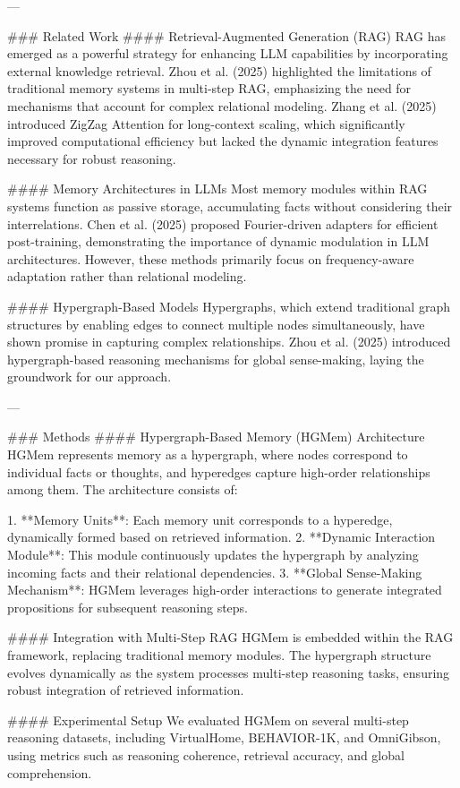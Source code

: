 ---

### Related Work  
#### Retrieval-Augmented Generation (RAG)  
RAG has emerged as a powerful strategy for enhancing LLM capabilities by incorporating external knowledge retrieval. Zhou et al. (2025) highlighted the limitations of traditional memory systems in multi-step RAG, emphasizing the need for mechanisms that account for complex relational modeling. Zhang et al. (2025) introduced ZigZag Attention for long-context scaling, which significantly improved computational efficiency but lacked the dynamic integration features necessary for robust reasoning.

#### Memory Architectures in LLMs  
Most memory modules within RAG systems function as passive storage, accumulating facts without considering their interrelations. Chen et al. (2025) proposed Fourier-driven adapters for efficient post-training, demonstrating the importance of dynamic modulation in LLM architectures. However, these methods primarily focus on frequency-aware adaptation rather than relational modeling.

#### Hypergraph-Based Models  
Hypergraphs, which extend traditional graph structures by enabling edges to connect multiple nodes simultaneously, have shown promise in capturing complex relationships. Zhou et al. (2025) introduced hypergraph-based reasoning mechanisms for global sense-making, laying the groundwork for our approach.

---

### Methods  
#### Hypergraph-Based Memory (HGMem) Architecture  
HGMem represents memory as a hypergraph, where nodes correspond to individual facts or thoughts, and hyperedges capture high-order relationships among them. The architecture consists of:

1. **Memory Units**: Each memory unit corresponds to a hyperedge, dynamically formed based on retrieved information.
2. **Dynamic Interaction Module**: This module continuously updates the hypergraph by analyzing incoming facts and their relational dependencies.
3. **Global Sense-Making Mechanism**: HGMem leverages high-order interactions to generate integrated propositions for subsequent reasoning steps.

#### Integration with Multi-Step RAG  
HGMem is embedded within the RAG framework, replacing traditional memory modules. The hypergraph structure evolves dynamically as the system processes multi-step reasoning tasks, ensuring robust integration of retrieved information.

#### Experimental Setup  
We evaluated HGMem on several multi-step reasoning datasets, including VirtualHome, BEHAVIOR-1K, and OmniGibson, using metrics such as reasoning coherence, retrieval accuracy, and global comprehension.

